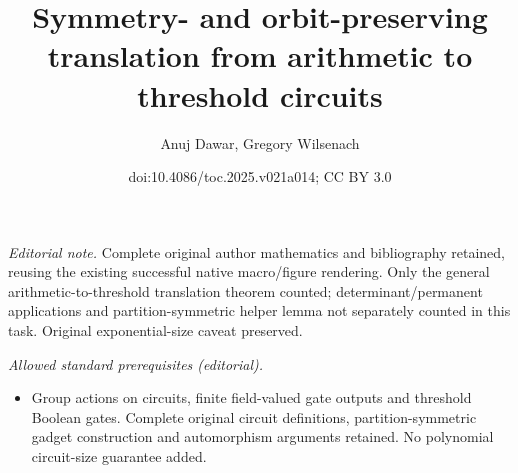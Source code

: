 \documentclass[11pt]{article}
\title{Symmetry- and orbit-preserving translation from arithmetic to threshold circuits}
\author{Anuj Dawar, Gregory Wilsenach}
\date{doi:10.4086/toc.2025.v021a014; CC BY 3.0}
\begin{document}
\maketitle
\noindent\textit{Editorial note.} Complete original author mathematics and bibliography retained, reusing the existing successful native macro/figure rendering. Only the general arithmetic-to-threshold translation theorem counted; determinant/permanent applications and partition-symmetric helper lemma not separately counted in this task. Original exponential-size caveat preserved.\par\medskip
\noindent\textit{Allowed standard prerequisites (editorial).}\begin{itemize}
\item Group actions on circuits, finite field-valued gate outputs and threshold Boolean gates. Complete original circuit definitions, partition-symmetric gadget construction and automorphism arguments retained. No polynomial circuit-size guarantee added.
\end{itemize}\medskip
\end{document}
